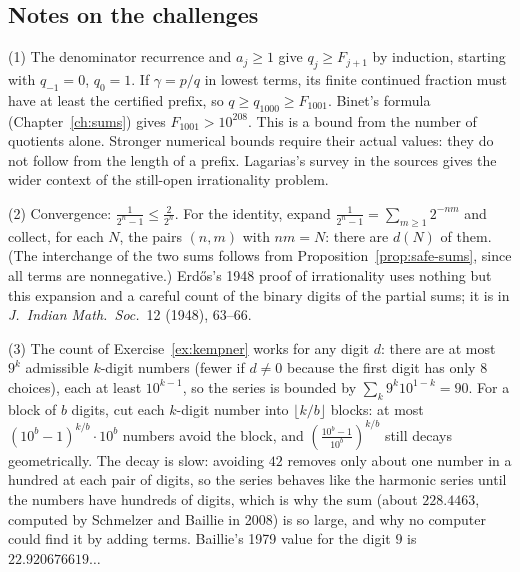 \subsection*{Notes on the challenges}

(1) The denominator recurrence and $a_j\ge1$ give $q_j\ge F_{j+1}$ by induction, starting with $q_{-1}=0$, $q_0=1$.
If $\gamma=p/q$ in lowest terms, its finite continued fraction must have at least the certified prefix, so $q\ge q_{1000}\ge F_{1001}$.
Binet's formula (Chapter~\ref{ch:sums}) gives $F_{1001}>10^{208}$.
This is a bound from the number of quotients alone. Stronger numerical bounds require their actual values: they do not follow from the length of a prefix.
Lagarias's survey in the sources gives the wider context of the still-open irrationality problem.

(2) Convergence: $\frac1{2^n-1}\le\frac2{2^n}$. For the identity, expand $\frac1{2^n-1}=\sum_{m\ge1}2^{-nm}$ and collect, for each $N$, the pairs $(n,m)$ with $nm=N$:
there are $d(N)$ of them. (The interchange of the two sums follows from Proposition~\ref{prop:safe-sums}, since all terms are nonnegative.) Erd\H{o}s's 1948
proof of irrationality uses nothing but this expansion and a careful count of the binary digits of the partial sums; it is in \emph{J.\ Indian Math.\ Soc.}\ 12 (1948), 63--66.

(3) The count of Exercise~\ref{ex:kempner} works for any digit $d$: there are at most $9^k$ admissible $k$-digit numbers (fewer if $d\ne0$ because the first
digit has only $8$ choices), each at least $10^{k-1}$, so the series is bounded by $\sum_k9^k10^{1-k}=90$. For a block of $b$ digits, cut each $k$-digit number
into $\lfloor k/b\rfloor$ blocks: at most $(10^b-1)^{k/b}\cdot10^{b}$ numbers avoid the block, and $\left(\frac{10^b-1}{10^b}\right)^{k/b}$ still decays
geometrically. The decay is slow: avoiding $42$ removes only about one number in a hundred at each pair of digits, so the series behaves like the
harmonic series until the numbers have hundreds of digits, which is why the sum (about $228.4463$, computed by Schmelzer and Baillie in 2008) is so large, and why
no computer could find it by adding terms. Baillie's 1979 value for the digit $9$ is $22.920676619\ldots$


